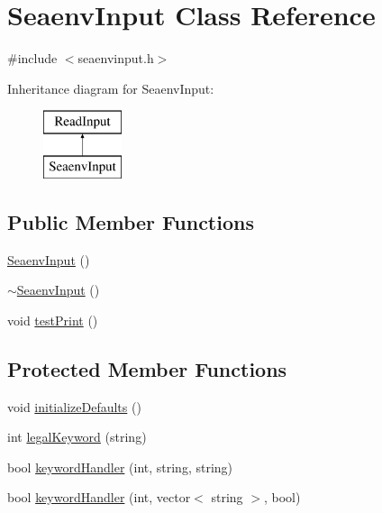 \hypertarget{class_seaenv_input}{\section{Seaenv\-Input Class Reference}
\label{class_seaenv_input}
}


{\ttfamily \#include $<$seaenvinput.\-h$>$}

Inheritance diagram for Seaenv\-Input\-:\begin{figure}[H]
\begin{center}
\leavevmode
\includegraphics[height=2.000000cm]{class_seaenv_input}
\end{center}
\end{figure}
\subsection*{Public Member Functions}
\begin{DoxyCompactItemize}
\item 
\hyperlink{class_seaenv_input_a1d4cf4bbf2effd0d558b7b97b02a092a}{Seaenv\-Input} ()
\item 
\hyperlink{class_seaenv_input_a1211270b8f35af72156e623852ce85a7}{$\sim$\-Seaenv\-Input} ()
\item 
void \hyperlink{class_seaenv_input_af215cdefc653fb335dc68de34962201f}{test\-Print} ()
\end{DoxyCompactItemize}
\subsection*{Protected Member Functions}
\begin{DoxyCompactItemize}
\item 
void \hyperlink{class_seaenv_input_a47a254de1906fcbea59ed961c9a1fc0a}{initialize\-Defaults} ()
\item 
int \hyperlink{class_seaenv_input_af0e063c0b66093ed993c79a62c8c092f}{legal\-Keyword} (string)
\item 
bool \hyperlink{class_seaenv_input_a79edff5224cca5323f679478c09b1c25}{keyword\-Handler} (int, string, string)
\item 
bool \hyperlink{class_seaenv_input_a3e8d24eadb9f83b1f0ff59cb8de1276e}{keyword\-Handler} (int, vector$<$ string $>$, bool)
\end{DoxyCompactItemize}



